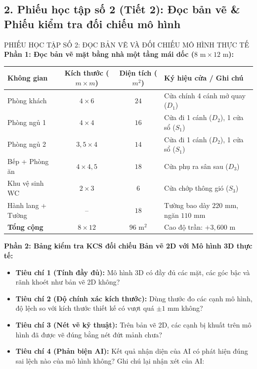 \documentclass[12pt, a4paper]{article}
\begin{document}
\subsection*{2. Phiếu học tập số 2 (Tiết 2): Đọc bản vẽ \& Phiếu kiểm tra đối chiếu mô hình}

\begin{pedabox}{PHIẾU HỌC TẬP SỐ 2: ĐỌC BẢN VẼ VÀ ĐỐI CHIẾU MÔ HÌNH THỰC TẾ}
\textbf{Phần 1: Đọc bản vẽ mặt bằng nhà một tầng mái dốc ($8\text{ m} \times 12\text{ m}$):}
\begin{center}
\begin{tabularx}{\linewidth}{|l|c|c|X|}
\hline
\textbf{Không gian} & \textbf{Kích thước ($m \times m$)} & \textbf{Diện tích ($m^2$)} & \textbf{Ký hiệu cửa / Ghi chú} \\ \hline
Phòng khách & $4 \times 6$ & $24$ & Cửa chính 4 cánh mở quay ($D_1$) \\ \hline
Phòng ngủ 1 & $4 \times 4$ & $16$ & Cửa đi 1 cánh ($D_2$), 1 cửa sổ ($S_1$) \\ \hline
Phòng ngủ 2 & $3{,}5 \times 4$ & $14$ & Cửa đi 1 cánh ($D_2$), 1 cửa sổ ($S_1$) \\ \hline
Bếp + Phòng ăn & $4 \times 4{,}5$ & $18$ & Cửa phụ ra sân sau ($D_3$) \\ \hline
Khu vệ sinh WC & $2 \times 3$ & $6$ & Cửa chớp thông gió ($S_3$) \\ \hline
Hành lang + Tường & -- & $18$ & Tường bao dày $220\text{ mm}$, ngăn $110\text{ mm}$ \\ \hline
\textbf{Tổng cộng} & $8 \times 12$ & \textbf{$96\text{ m}^2$} & Cao độ trần: $+3{,}600\text{ m}$ \\ \hline
\end{tabularx}
\end{center}

\textbf{Phần 2: Bảng kiểm tra KCS đối chiếu Bản vẽ 2D với Mô hình 3D thực tế:}
\begin{itemize}[leftmargin=0.6cm]
    \item[$\square$] \textbf{Tiêu chí 1 (Tính đầy đủ):} Mô hình 3D có đầy đủ các mặt, các góc bậc và rãnh khoét như bản vẽ 2D không?
    \item[$\square$] \textbf{Tiêu chí 2 (Độ chính xác kích thước):} Dùng thước đo các cạnh mô hình, độ lệch so với kích thước thiết kế có vượt quá $\pm 1\text{ mm}$ không?
    \item[$\square$] \textbf{Tiêu chí 3 (Nét vẽ kỹ thuật):} Trên bản vẽ 2D, các cạnh bị khuất trên mô hình đã được vẽ đúng bằng nét đứt mảnh chưa?
    \item[$\square$] \textbf{Tiêu chí 4 (Phản biện AI):} Kết quả nhận diện của AI có phát hiện đúng sai lệch nào của mô hình không? Ghi chú lại nhận xét của AI: \dotfill
\end{itemize}
\end{pedabox}
\end{document}
